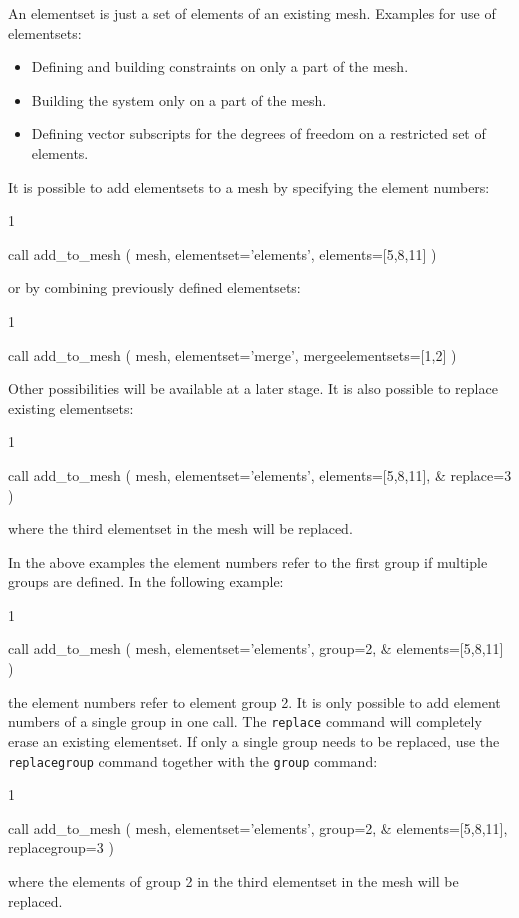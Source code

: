 An elementset is just a set of elements of an existing mesh.
Examples for use of elementsets:
\begin{itemize}
   \item Defining and building constraints on only a part of the mesh. 
   \item Building the system only on a part of the mesh.
   \item Defining vector subscripts for the degrees of freedom on a restricted set of elements.
\end{itemize}
It is possible to add elementsets to a mesh by specifying the element numbers:
\begin{listing}{1}

  call add_to_mesh ( mesh, elementset='elements', elements=[5,8,11] )
   
\end{listing}
or by combining previously defined elementsets:
\begin{listing}{1}

  call add_to_mesh ( mesh, elementset='merge', mergeelementsets=[1,2] )
   
\end{listing}
Other possibilities will be available at a later stage.
It is also possible to replace existing elementsets:
\begin{listing}{1}

  call add_to_mesh ( mesh, elementset='elements', elements=[5,8,11], &
    replace=3 )
   
\end{listing}
where the third elementset in the mesh will be replaced.

In the above examples the element numbers refer to the first group if multiple
groups are defined. In the following example:
\begin{listing}{1}

  call add_to_mesh ( mesh, elementset='elements', group=2, &
    elements=[5,8,11] )

\end{listing}
the element numbers refer to element group 2. It is only possible to add
element numbers of a single group in one call. The \texttt{replace} command
will completely erase an existing elementset. If only a single group needs to be
replaced, use the \texttt{replacegroup} command together with the
\texttt{group} command:
\begin{listing}{1}

  call add_to_mesh ( mesh, elementset='elements', group=2, &
    elements=[5,8,11], replacegroup=3 )
   
\end{listing}
where the elements of group 2 in the third elementset in the mesh will
be replaced.

